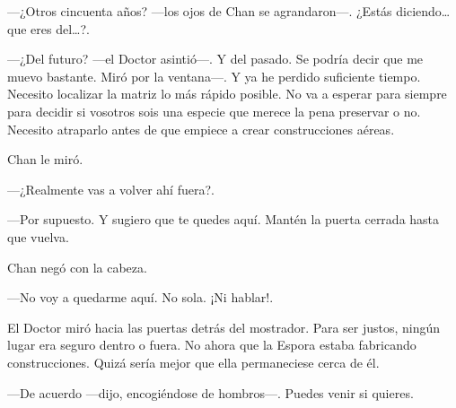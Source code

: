 ---¿Otros cincuenta años? ---los ojos de Chan se agrandaron---. ¿Estás
diciendo\ldots{} que eres del\ldots{}?.

---¿Del futuro? ---el Doctor asintió---. Y del pasado. Se podría decir
que me muevo bastante. Miró por la ventana---. Y ya he perdido
suficiente tiempo. Necesito localizar la matriz lo más rápido posible.
No va a esperar para siempre para decidir si vosotros sois una especie
que merece la pena preservar o no. Necesito atraparlo antes de que
empiece a crear construcciones aéreas.

Chan le miró.

---¿Realmente vas a volver ahí fuera?.

---Por supuesto. Y sugiero que te quedes aquí. Mantén la puerta cerrada
hasta que vuelva.

Chan negó con la cabeza.

---No voy a quedarme aquí. No sola. ¡Ni hablar!.

El Doctor miró hacia las puertas detrás del mostrador. Para ser justos,
ningún lugar era seguro dentro o fuera. No ahora que la Espora estaba
fabricando construcciones. Quizá sería mejor que ella permaneciese cerca
de él.

---De acuerdo ---dijo, encogiéndose de hombros---. Puedes venir si
quieres.